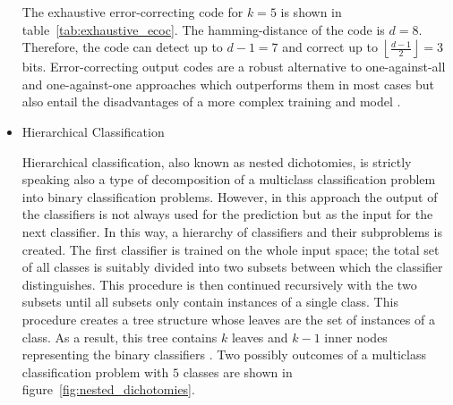\documentclass[article,type=msc,colorback,accentcolor=tud7b]{tudthesis}
\begin{document}
\begin{itemize}
\begin{table}[H]
          \caption[Output codes for a multiclass classification problem]{Different output codes for a multiclass classification problem with five classes}
          \label{tab:exhaustive_ecoc}
        \end{table}

        The exhaustive error-correcting code for $k=5$ is shown in table~\ref{tab:exhaustive_ecoc}. The hamming-distance of the code is $d=8$. Therefore, the code can detect up to $d-1=7$ and correct up to $\left\lfloor\frac{d-1}{2}\right\rfloor=3$ bits. Error-correcting output codes are a robust alternative to one-against-all and one-against-one approaches which outperforms them in most cases but also entail the disadvantages of a more complex training and model \autocite[chapter~4]{Dietterich1994}.
      \item Hierarchical Classification

        Hierarchical classification, also known as nested dichotomies, is strictly speaking also a type of decomposition of a multiclass classification problem into binary classification problems. However, in this approach the output of the classifiers is not always used for the prediction but as the input for the next classifier. In this way, a hierarchy of classifiers and their subproblems is created. The first classifier is trained on the whole input space; the total set of all classes is suitably divided into two subsets between which the classifier distinguishes. This procedure is then continued recursively with the two subsets until all subsets only contain instances of a single class. This procedure creates a tree structure whose leaves are the set of instances of a class. As a result, this tree contains $k$ leaves and $k-1$ inner nodes representing the binary classifiers \autocite{Dong2005}. Two possibly outcomes of a multiclass classification problem with $5$ classes are shown in figure~\ref{fig:nested_dichotomies}.


\end{itemize}
\end{document}
